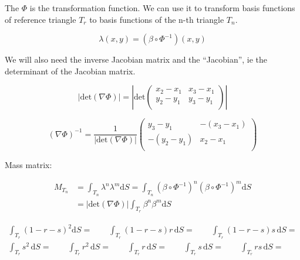 \noindent The $\Phi$ is the transformation function. We can use it to transform basis functions of reference triangle $T_r$ to basis functions of the n-th triangle $T_n$.

\begin{equation} \label{eq:ap18}
\lambda\left(x,y\right) = \left( \beta \circ \Phi^{-1}\right) \left(x,y\right)
\end{equation}

\noindent We will also need the inverse Jacobian matrix and the “Jacobian”, ie the determinant of the Jacobian matrix.

\begin{equation} \label{eq:ap19}
\vert \mathrm{det} \left(\nabla \Phi \right) \vert = \left| \mathrm{det} \begin{pmatrix} x_2 - x_1 & x_3 - x_1  \\ y_2 - y_1 & y_3 - y_1 \\ \end{pmatrix} \right|
\end{equation} 

\begin{equation} \label{eq:ap20}
\left(\nabla \Phi \right)^{-1} = \frac{1}{\vert \mathrm{det} \left(\nabla \Phi \right) \vert} \begin{pmatrix} y_3 - y_1  &    -\left(x_3 - x_1\right) \\ -\left( y_2 - y_1 \right) & x_2 - x_1 \\ \end{pmatrix}
\end{equation}

\noindent Mass matrix:

\begin{align*}
M_{T_n} &= \int_{T_n} \lambda^n \lambda^m \mathrm{d}S =  \int_{T_n} \left( \beta \circ \Phi^{-1}\right)^n \left( \beta \circ \Phi^{-1}\right)^m \mathrm{d}S \\
&= \vert \mathrm{det} \left(\nabla \Phi \right) \vert \int_{T_r} \beta^n \beta^m \mathrm{d}S
\end{align*}


\begin{align*}
\int_{T_r} \left(1-r-s\right)^2 \mathrm{d}S =  \qquad \int_{T_r} \left(1-r-s\right)r \,\mathrm{d}S = \qquad \int_{T_r} \left(1-r-s\right)s \,\mathrm{d}S = \\
\int_{T_r} s^2 \,\mathrm{d}S =  \qquad \int_{T_r} r^2 \,\mathrm{d}S =  \qquad \int_{T_r} r \,\mathrm{d}S = \qquad \int_{T_r} s \,\mathrm{d}S = \qquad \int_{T_r} rs \,\mathrm{d}S =  \\
\end{align*}


